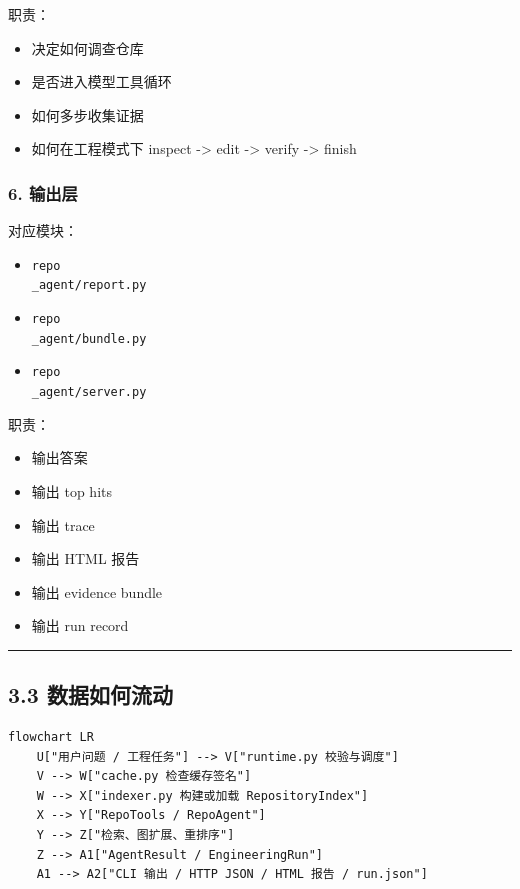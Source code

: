\documentclass[UTF8,12pt,openany]{ctexbook}
\begin{document}
职责：\par

\begin{itemize}
\item 决定如何调查仓库
\item 是否进入模型工具循环
\item 如何多步收集证据
\item 如何在工程模式下 inspect -> edit -> verify -> finish
\end{itemize}

\subsubsection{6. 输出层}

对应模块：\par

\begin{itemize}
\item \texttt{repo\\_agent/report.py}
\item \texttt{repo\\_agent/bundle.py}
\item \texttt{repo\\_agent/server.py}
\end{itemize}

职责：\par

\begin{itemize}
\item 输出答案
\item 输出 top hits
\item 输出 trace
\item 输出 HTML 报告
\item 输出 evidence bundle
\item 输出 run record
\end{itemize}

\hrule

\subsection{3.3 数据如何流动}

\begin{lstlisting}
flowchart LR
    U["用户问题 / 工程任务"] --> V["runtime.py 校验与调度"]
    V --> W["cache.py 检查缓存签名"]
    W --> X["indexer.py 构建或加载 RepositoryIndex"]
    X --> Y["RepoTools / RepoAgent"]
    Y --> Z["检索、图扩展、重排序"]
    Z --> A1["AgentResult / EngineeringRun"]
    A1 --> A2["CLI 输出 / HTTP JSON / HTML 报告 / run.json"]
\end{lstlisting}
\end{document}
